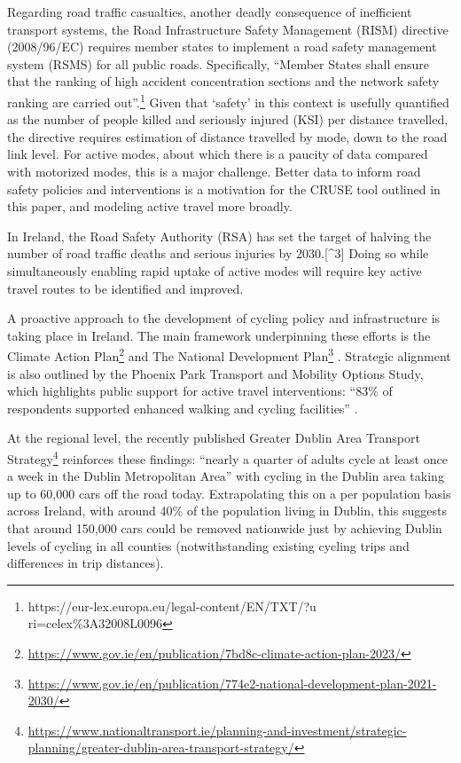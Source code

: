 \documentclass[
  super,
  preprint,
  3p]{elsarticle}
\begin{document}
Regarding road traffic casualties, another deadly consequence of
inefficient transport systems, the Road Infrastructure Safety Management
(RISM) directive (2008/96/EC) requires member states to implement a road
safety management system (RSMS) for all public roads. Specifically,
``Member States shall ensure that the ranking of high accident
concentration sections and the network safety ranking are carried
out''.\footnote{https://eur-lex.europa.eu/legal-content/EN/TXT/?u
  ri=celex\%3A32008L0096} Given that `safety' in this context is
usefully quantified as the number of people killed and seriously injured
(KSI) per distance travelled, the directive requires estimation of
distance travelled by mode, down to the road link level. For active
modes, about which there is a paucity of data compared with motorized
modes, this is a major challenge. Better data to inform road safety
policies and interventions is a motivation for the CRUSE tool outlined
in this paper, and modeling active travel more broadly.

In Ireland, the Road Safety Authority (RSA) has set the target of
halving the number of road traffic deaths and serious injuries by
2030.{[}\^{}3{]} Doing so while simultaneously enabling rapid uptake of
active modes will require key active travel routes to be identified and
improved.

A proactive approach to the development of cycling policy and
infrastructure is taking place in Ireland. The main framework
underpinning these efforts is the Climate Action Plan\footnote{\url{https://www.gov.ie/en/publication/7bd8c-climate-action-plan-2023/}}
and The National Development Plan\footnote{\url{https://www.gov.ie/en/publication/774e2-national-development-plan-2021-2030/}}
. Strategic alignment is also outlined by the Phoenix Park Transport and
Mobility Options Study, which highlights public support for active
travel interventions: ``83\% of respondents supported enhanced walking
and cycling facilities'' .

At the regional level, the recently published Greater Dublin Area
Transport Strategy\footnote{\url{https://www.nationaltransport.ie/planning-and-investment/strategic-planning/greater-dublin-area-transport-strategy/}}
reinforces these findings: ``nearly a quarter of adults cycle at least
once a week in the Dublin Metropolitan Area'' with cycling in the Dublin
area taking up to 60,000 cars off the road today. Extrapolating this on
a per population basis across Ireland, with around 40\% of the
population living in Dublin, this suggests that around 150,000 cars
could be removed nationwide just by achieving Dublin levels of cycling
in all counties (notwithstanding existing cycling trips and differences
in trip distances).
\end{document}

